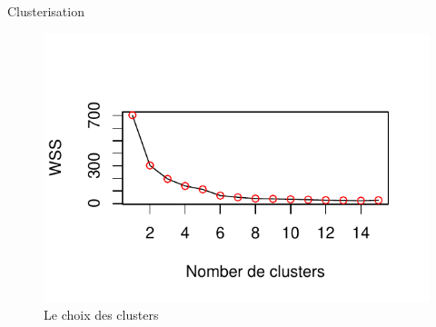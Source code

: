\documentclass[11pt,ignorenonframetext,]{beamer}
\begin{document}
\begin{frame}{Clusterisation}
\protect\hypertarget{clusterisation}{}

\tiny

\begin{figure}[!htbp]

{\centering \includegraphics{Presentation_files/figure-beamer/unnamed-chunk-68-1} 

}

\caption{Le choix des clusters}\label{fig:unnamed-chunk-68}
\end{figure}

\normalsize

\end{frame}
\end{document}
